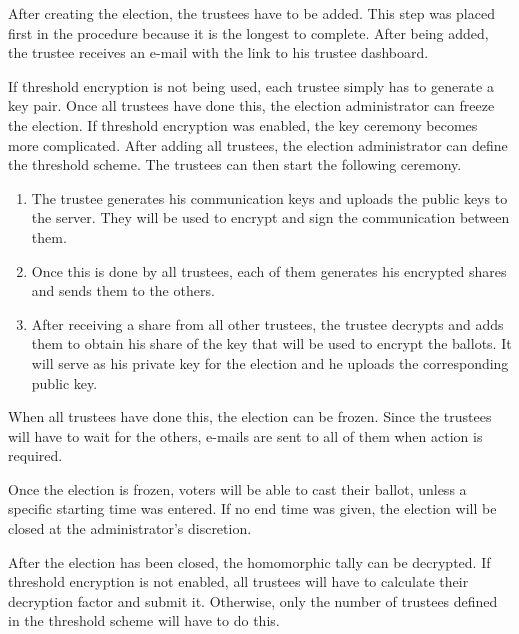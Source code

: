 \par After creating the election, the trustees have to be added. This step was placed first in the procedure because it is the longest to complete. After being added, the trustee receives an e-mail with the link to his trustee dashboard.

\par If threshold encryption is not being used, each trustee simply has to generate a key pair. Once all trustees have done this, the election administrator can freeze the election. If threshold encryption was enabled, the key ceremony becomes more complicated. After adding all trustees, the election administrator can define the threshold scheme. The trustees can then start the following ceremony.

\begin{enumerate}
  \item The trustee generates his communication keys and uploads the public keys to the server. They will be used to encrypt and sign the communication between them.
  \item Once this is done by all trustees, each of them generates his encrypted shares and sends them to the others.
  \item After receiving a share from all other trustees, the trustee decrypts and adds them to obtain his share of the key that will be used to encrypt the ballots. It will serve as his private key for the election and he uploads the corresponding public key.
\end{enumerate}

\par When all trustees have done this, the election can be frozen. Since the trustees will have to wait for the others, e-mails are sent to all of them when action is required.

\par Once the election is frozen, voters will be able to cast their ballot, unless a specific starting time was entered. If no end time was given, the election will be closed at the administrator's discretion.

\par After the election has been closed, the homomorphic tally can be decrypted. If threshold encryption is not enabled, all trustees will have to calculate their decryption factor and submit it. Otherwise, only the number of trustees defined in the threshold scheme will have to do this.
